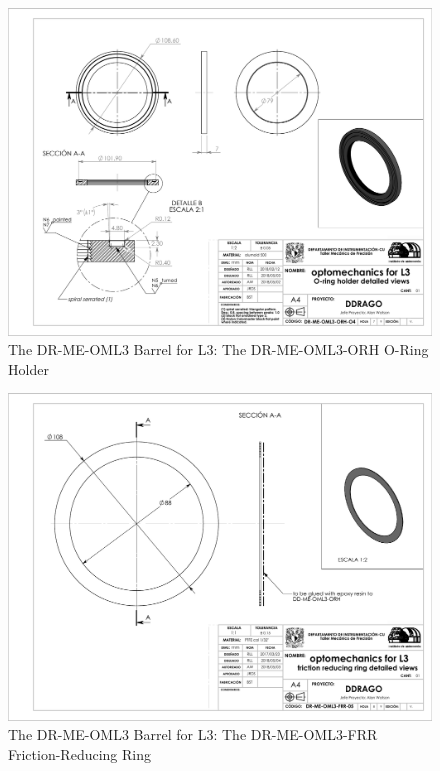 \documentclass{article}
\begin{document}
\begin{figure}
\begin{center}
\includegraphics[height=\linewidth,angle=90]{figures/DR-ME-OML3-ORH-04}
\end{center}
\caption{The DR-ME-OML3 Barrel for L3: The DR-ME-OML3-ORH O-Ring Holder}
\label{figure:rosalia-oml3-orh}
\end{figure}

\begin{figure}
\begin{center}
\includegraphics[height=\linewidth,angle=90]{figures/DR-ME-OML3-FRR-05}
\end{center}
\caption{The DR-ME-OML3 Barrel for L3: The DR-ME-OML3-FRR Friction-Reducing Ring}
\label{figure:rosalia-oml3-frr}
\end{figure}
\end{document}
